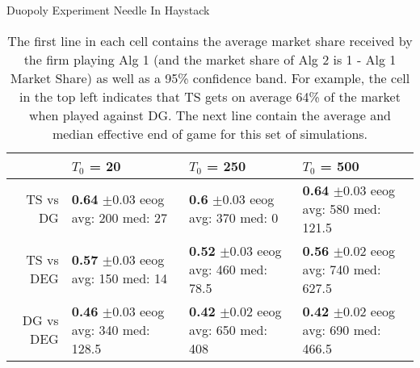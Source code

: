 \documentclass[../competing_bandits.tex]{subfiles}
\begin{document}
\begin{table}[ht]
\centering
\caption{Duopoly Experiment Needle In Haystack}
\begin{tabular}{rlll}
  \hline
 & $T_0$ = 20 & $T_0$ = 250 & $T_0$ = 500 \\
  \hline
TS vs DG & \makecell{\textbf{0.64} $\pm$0.03\\ eeog \\ avg: 200\\ med: 27} & \makecell{\textbf{0.6} $\pm$0.03\\ eeog \\ avg: 370\\ med: 0} & \makecell{\textbf{0.64} $\pm$0.03\\ eeog \\ avg: 580\\ med: 121.5} \\
  TS vs DEG & \makecell{\textbf{0.57} $\pm$0.03\\ eeog \\ avg: 150\\ med: 14} & \makecell{\textbf{0.52} $\pm$0.03\\ eeog \\ avg: 460\\ med: 78.5} & \makecell{\textbf{0.56} $\pm$0.02\\ eeog \\ avg: 740\\ med: 627.5} \\
  DG vs DEG & \makecell{\textbf{0.46} $\pm$0.03\\ eeog \\ avg: 340\\ med: 128.5} & \makecell{\textbf{0.42} $\pm$0.02\\ eeog \\ avg: 650\\ med: 408} & \makecell{\textbf{0.42} $\pm$0.02\\ eeog \\ avg: 690\\ med: 466.5} \\
   \hline
\end{tabular}
\label{sim_nih}
\caption*{\tiny{The first line in each cell contains the average market share received by the firm playing Alg 1 (and the market share of Alg 2 is 1 - Alg 1 Market Share) as well as a 95\% confidence band. For example, the cell in the top left indicates that TS gets on average 64\% of the market when played against DG. The next line contain the average and median effective end of game for this set of simulations.}}
\end{table}
\end{document}
